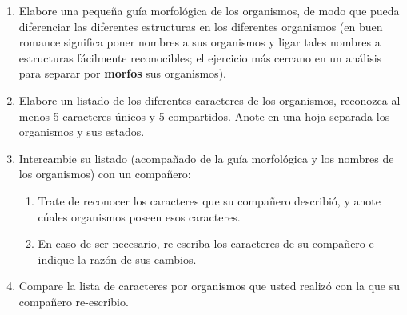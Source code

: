 \begin{enumerate}
	\item Elabore una peque\~na gu\'ia morfol\'ogica de los organismos, de modo que pueda diferenciar las diferentes estructuras en los diferentes organismos (en buen romance significa poner nombres a sus organismos y ligar tales nombres a estructuras f\'acilmente reconocibles; el ejercicio m\'as cercano en un an\'alisis para separar por \textbf{morfos} sus organismos).
	\item Elabore un listado de los diferentes caracteres de los organismos, reconozca al menos 5 caracteres \'unicos y 5 compartidos. Anote en una hoja separada los organismos y sus estados.
	\item Intercambie su listado (acompa\~nado de la gu\'ia morfol\'ogica y los nombres de los organismos) con un compa\~nero: 
	\begin{enumerate}
		\item Trate de reconocer los caracteres que su compa\~nero describi\'o, y anote c\'uales organismos poseen esos caracteres.
		\item En caso de ser necesario, re-escriba los caracteres de su compa\~nero e indique la raz\'on de sus cambios.
	\end{enumerate}
		\item Compare la lista de caracteres por organismos que usted realiz\'o con la que su compa\~nero re-escribio.
\end{enumerate}



